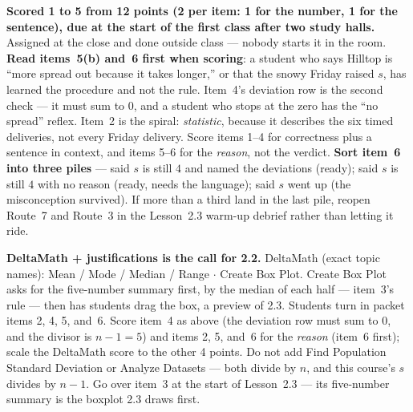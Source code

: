 \documentclass[10pt]{article}
\begin{document}
\begin{teachernote}[Homework]
\textbf{Scored 1 to 5 from 12 points (2 per item: 1 for the number, 1 for the sentence), due at the start
of the first class after two study halls.} Assigned at the close and done outside class ---
nobody starts it in the room. \textbf{Read items~5(b) and~6 first when scoring}: a student who
says Hilltop is ``more spread out because it takes longer,'' or that the snowy Friday raised $s$,
has learned the procedure and not the rule. Item~4's deviation row is the second check --- it
must sum to $0$, and a student who stops at the zero has the ``no spread'' reflex. Item~2 is the
spiral: \emph{statistic}, because it describes the six timed deliveries, not every Friday
delivery. Score items 1--4 for correctness plus a sentence in context, and items 5--6 for the
\emph{reason}, not the verdict. \textbf{Sort item~6 into three piles} --- said $s$ is still $4$
and named the deviations (ready); said $s$ is still $4$ with no reason (ready, needs the
language); said $s$ went up (the misconception survived). If more than a third land in the last
pile, reopen Route~7 and Route~3 in the Lesson~2.3 warm-up debrief rather than letting it ride.

\textbf{DeltaMath + justifications is the call for 2.2.} DeltaMath (exact topic names): Mean /
Mode / Median / Range $\cdot$ Create Box Plot. Create Box Plot asks for the five-number summary
first, by the median of each half --- item~3's rule --- then has students drag the box, a preview
of 2.3. Students turn in packet items 2, 4, 5, and~6. Score item~4 as above (the deviation row
must sum to $0$, and the divisor is $n - 1 = 5$) and items 2, 5, and~6 for the \emph{reason}
(item~6 first); scale the DeltaMath score to the other 4 points. Do not add Find Population Standard Deviation or Analyze Datasets --- both divide by $n$, and this course's $s$ divides by $n - 1$.
Go over item~3 at the start of Lesson~2.3 --- its five-number summary is the boxplot 2.3 draws
first.
\end{teachernote}
\end{document}
